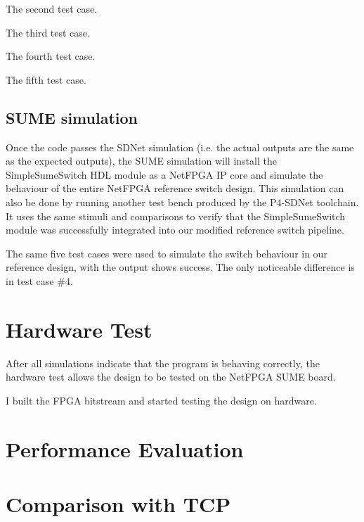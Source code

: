 The second test case.

The third test case.

The fourth test case.

The fifth test case.

\subsection{SUME simulation}
Once the code passes the SDNet simulation (i.e. the actual outputs are the same as the expected outputs), the SUME simulation will install the SimpleSumeSwitch HDL module as a NetFPGA IP core and simulate the behaviour of the entire NetFPGA reference switch design. This simulation can also be done by running another test bench produced by the P4-SDNet toolchain. It uses the same stimuli and comparisons to verify that the SimpleSumeSwitch module was successfully integrated into our modified reference switch pipeline. 

The same five test cases were used to simulate the switch behaviour in our reference design, with the output shows success. The only noticeable difference is in test case \#4. 

\section{Hardware Test}
After all simulations indicate that the program is behaving correctly, the hardware test allows the design to be tested on the NetFPGA SUME board. 

I built the FPGA bitstream and started testing the design on hardware.

\section{Performance Evaluation}
\section{Comparison with TCP}

